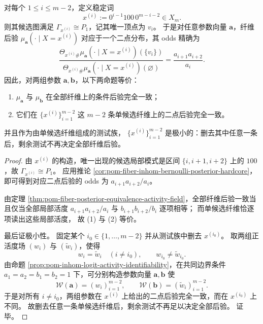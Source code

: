 \begin{proposition}[单候选纤维给出的极小确定性测试族]\label{prop:pom-fiber-posterior-equivalence-single-candidate-test}
对每个 \(1\le i\le m-2\)，定义稳定词
\[
x^{(i)}:=0^{i-1}100\,0^{m-i-2}\in X_m.
\]
则其候选图满足
\(
\Gamma_{x^{(i)}}\cong P_1
\)，记其唯一顶点为 \(v_i\)。
于是对任意参数向量 \(\boldsymbol a\)，纤维后验
\(
\mu_{\boldsymbol a}(\cdot\mid X=x^{(i)})
\)
对应于一个二点分布，其 odds 精确为
\[
\frac{
\Theta_{x^{(i)}\#}\mu_{\boldsymbol a}(\cdot\mid X=x^{(i)})(\{v_i\})
}{
\Theta_{x^{(i)}\#}\mu_{\boldsymbol a}(\cdot\mid X=x^{(i)})(\varnothing)
}
=\frac{a_{i+1}a_{i+2}}{a_i}.
\]
因此，对两组参数 \(\boldsymbol a,\boldsymbol b\)，以下两命题等价：
\begin{enumerate}
  \item \(\mu_{\boldsymbol a}\) 与 \(\mu_{\boldsymbol b}\) 在全部纤维上的条件后验完全一致；
  \item 它们在
  \(
  \{x^{(i)}\}_{i=1}^{m-2}
  \)
  这 \(m-2\) 条单候选纤维上的二点后验完全一致。
\end{enumerate}
并且作为由单候选纤维组成的测试族，
\(
\{x^{(i)}\}_{i=1}^{m-2}
\)
是极小的：删去其中任意一条后，剩余测试不再决定全部纤维后验。
\end{proposition}
\begin{proof}
由 \(x^{(i)}\) 的构造，唯一出现的候选局部模式是区间 \(\{i,i+1,i+2\}\) 上的 \(100\)，故
\(
\Gamma_{x^{(i)}}\cong P_1
\)。
应用推论 \ref{cor:pom-fiber-inhom-bernoulli-posterior-hardcore}，即可得到对应二点后验的 odds 为
\(
a_{i+1}a_{i+2}/a_i
\)。

由定理 \ref{thm:pom-fiber-posterior-equivalence-activity-field}，全部纤维后验一致当且仅当全部局部活度
\(
a_{i+1}a_{i+2}/a_i
\)
与
\(
b_{i+1}b_{i+2}/b_i
\)
逐项相等；
而单候选纤维恰逐项读出这些局部活度，
故 (1) 与 (2) 等价。

最后证极小性。
固定某个 \(i_0\in\{1,\dots,m-2\}\) 并从测试族中删去 \(x^{(i_0)}\)。
取两组正活度场 \((w_i)\) 与 \((\widetilde w_i)\)，使得
\[
w_i=\widetilde w_i\quad(i\neq i_0),
\qquad
w_{i_0}\neq \widetilde w_{i_0}.
\]
由命题 \ref{prop:pom-inhom-logit-activity-identifiability}，在共同边界条件 \(a_1=a_2=b_1=b_2=1\) 下，可分别构造参数向量 \(\boldsymbol a,\boldsymbol b\) 使
\[
\mathcal W(\boldsymbol a)=(w_i)_{i=1}^{m-2},
\qquad
\mathcal W(\boldsymbol b)=(\widetilde w_i)_{i=1}^{m-2}.
\]
于是对所有 \(i\neq i_0\)，两组参数在 \(x^{(i)}\) 上给出的二点后验完全一致，而在 \(x^{(i_0)}\) 上不同。
故删去任意一条单候选纤维后，剩余测试不再足以决定全部后验。
证毕。
\end{proof}

\endinput

